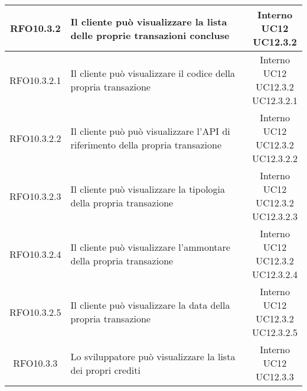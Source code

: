 \begin{longtable}{|c|p{8cm}|c|}
\hypertarget{RFO10.3.2}{RFO10.3.2} & Il cliente può visualizzare la lista delle proprie transazioni concluse & \makecell*{Interno\\UC12\\UC12.3.2} \\
\hline

\hypertarget{RFO10.3.2.1}{RFO10.3.2.1} & Il cliente può visualizzare il codice della propria transazione & \makecell*{Interno\\UC12\\UC12.3.2\\UC12.3.2.1} \\
\hline
\hypertarget{RFO10.3.2.2}{RFO10.3.2.2} & Il cliente può può visualizzare l'API di riferimento della propria transazione & \makecell*{Interno\\UC12\\UC12.3.2\\UC12.3.2.2} \\
\hline
\hypertarget{RFO10.3.2.3}{RFO10.3.2.3} & Il cliente può visualizzare la tipologia della propria transazione & \makecell*{Interno\\UC12\\UC12.3.2\\UC12.3.2.3} \\
\hline
\hypertarget{RFO10.3.2.4}{RFO10.3.2.4} & Il cliente può visualizzare l'ammontare della propria transazione & \makecell*{Interno\\UC12\\UC12.3.2\\UC12.3.2.4} \\
\hline
\hypertarget{RFO10.3.2.5}{RFO10.3.2.5} & Il cliente può visualizzare la data della propria transazione & \makecell*{Interno\\UC12\\UC12.3.2\\UC12.3.2.5} \\
\hline

\hypertarget{RFO10.3.3}{RFO10.3.3} & Lo sviluppatore può visualizzare la lista dei propri crediti & \makecell*{Interno\\UC12\\UC12.3.3} \\
\hline


\end{longtable}
